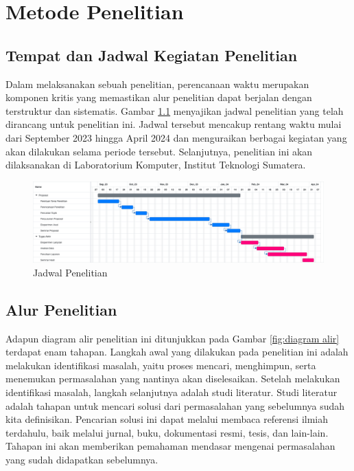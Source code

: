 \chapter{Metode Penelitian}
\section{Tempat dan Jadwal Kegiatan Penelitian}
Dalam melaksanakan sebuah penelitian, perencanaan waktu merupakan komponen kritis yang memastikan alur penelitian dapat berjalan dengan terstruktur dan sistematis. Gambar \ref{fig:jadwal-penelitian} menyajikan jadwal penelitian yang telah dirancang untuk penelitian ini. Jadwal tersebut mencakup rentang waktu mulai dari September 2023 hingga April 2024 dan menguraikan berbagai kegiatan yang akan dilakukan selama periode tersebut. Selanjutnya, penelitian ini akan dilaksanakan di Laboratorium Komputer, Institut Teknologi Sumatera.

\begin{figure}[h!]
    \centering
    \includegraphics[width=1\textwidth]{figures/ch03/Timeline-2.png}
    \caption{Jadwal Penelitian}
    \label{fig:jadwal-penelitian}
\end{figure}


\section{Alur Penelitian}
Adapun diagram alir penelitian ini ditunjukkan pada Gambar \ref{fig:diagram alir} terdapat enam tahapan. Langkah awal yang dilakukan pada penelitian ini adalah melakukan identifikasi masalah, yaitu proses mencari, menghimpun, serta menemukan permasalahan yang nantinya akan diselesaikan. Setelah melakukan identifikasi masalah, langkah selanjutnya adalah studi literatur. Studi literatur adalah tahapan untuk mencari solusi dari permasalahan yang sebelumnya sudah kita definisikan. Pencarian solusi ini dapat melalui membaca referensi ilmiah terdahulu, baik melalui jurnal, buku, dokumentasi resmi, tesis, dan lain-lain. Tahapan ini akan memberikan pemahaman mendasar mengenai permasalahan yang sudah didapatkan sebelumnya. 


